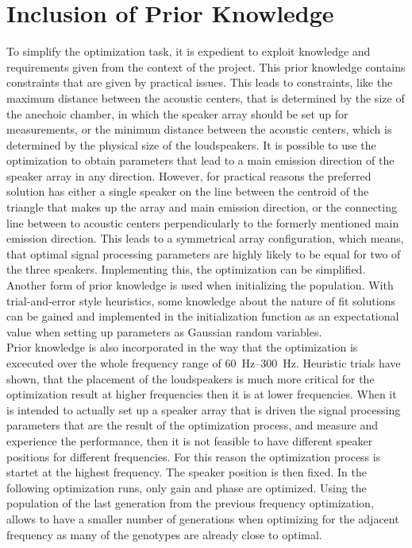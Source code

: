 \section{Inclusion of Prior Knowledge}\label{sec:ga_prior}
To simplify the optimization task, it is expedient to exploit knowledge and requirements given from the context of the project. This prior knowledge contains constraints that are given by practical issues. This leads to constraints, like the maximum distance between the acoustic centers, that is determined by the size of the anechoic chamber, in which the speaker array should be set up for measurements, or the minimum distance between the acoustic centers, which is determined by the physical size of the loudspeakers. It is possible to use the optimization to obtain parameters that lead to a main emission direction of the speaker array in any direction. However, for practical reasons the preferred solution has either a single speaker on the line between the centroid of the triangle that makes up the array and main emission direction, or the connecting line between to acoustic centers perpendicularly to the formerly mentioned main emission direction. This leads to a symmetrical array configuration, which means, that optimal signal processing parameters are highly likely to be equal for two of the three speakers. Implementing this, the optimization can be simplified.
Another form of prior knowledge is used when initializing the population. With trial-and-error style heuristics, some knowledge about the nature of fit solutions can be gained and implemented in the initialization function as an expectational value when setting up parameters as Gaussian random variables.\\
Prior knowledge is also incorporated in the way that the optimization is excecuted over the whole frequency range of \SIrange{60}{300}{\hertz}. Heuristic trials have shown, that the placement of the loudspeakers is much more critical for the optimization result at higher frequencies then it is at lower frequencies. When it is intended to actually set up a speaker array that is driven the signal processing parameters that are the result of the optimization process, and measure and experience the performance, then it is not feasible to have different speaker positions for different frequencies. For this reason the optimization process is startet at the highest frequency. The speaker position is then fixed. In the following optimization runs, only gain and phase are optimized. Using the population of the last generation from the previous frequency optimization, allows to have a smaller number of generations when optimizing for the adjacent frequency as many of the genotypes are already close to optimal.


